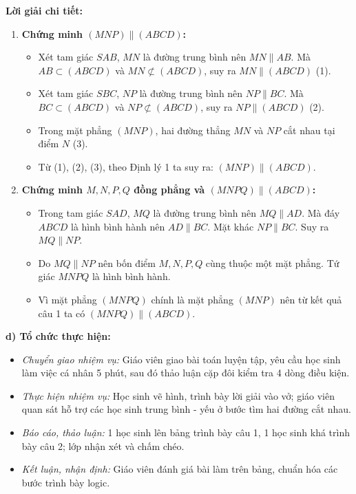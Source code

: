 \documentclass[12pt, a4paper]{article}
\begin{document}
\textbf{Lời giải chi tiết:}
\begin{enumerate}[leftmargin=0.6cm]
    \item \textbf{Chứng minh $(MNP) \parallel (ABCD)$:}
    \begin{itemize}
        \item Xét tam giác $SAB$, $MN$ là đường trung bình nên $MN \parallel AB$.
        Mà $AB \subset (ABCD)$ và $MN \not\subset (ABCD)$, suy ra $MN \parallel (ABCD)$ (1).
        \item Xét tam giác $SBC$, $NP$ là đường trung bình nên $NP \parallel BC$.
        Mà $BC \subset (ABCD)$ và $NP \not\subset (ABCD)$, suy ra $NP \parallel (ABCD)$ (2).
        \item Trong mặt phẳng $(MNP)$, hai đường thẳng $MN$ và $NP$ cắt nhau tại điểm $N$ (3).
        \item Từ (1), (2), (3), theo Định lý 1 ta suy ra: $(MNP) \parallel (ABCD)$.
    \end{itemize}

    \item \textbf{Chứng minh $M, N, P, Q$ đồng phẳng và $(MNPQ) \parallel (ABCD)$:}
    \begin{itemize}
        \item Trong tam giác $SAD$, $MQ$ là đường trung bình nên $MQ \parallel AD$. Mà đáy $ABCD$ là hình bình hành nên $AD \parallel BC$. Mặt khác $NP \parallel BC$. Suy ra $MQ \parallel NP$.
        \item Do $MQ \parallel NP$ nên bốn điểm $M, N, P, Q$ cùng thuộc một mặt phẳng. Tứ giác $MNPQ$ là hình bình hành.
        \item Vì mặt phẳng $(MNPQ)$ chính là mặt phẳng $(MNP)$ nên từ kết quả câu 1 ta có $(MNPQ) \parallel (ABCD)$.
    \end{itemize}
\end{enumerate}

\noindent \textbf{d) Tổ chức thực hiện:}
\begin{itemize}[leftmargin=0.8cm]
    \item \textit{Chuyển giao nhiệm vụ:} Giáo viên giao bài toán luyện tập, yêu cầu học sinh làm việc cá nhân 5 phút, sau đó thảo luận cặp đôi kiểm tra 4 dòng điều kiện.
    \item \textit{Thực hiện nhiệm vụ:} Học sinh vẽ hình, trình bày lời giải vào vở; giáo viên quan sát hỗ trợ các học sinh trung bình - yếu ở bước tìm hai đường cắt nhau.
    \item \textit{Báo cáo, thảo luận:} 1 học sinh lên bảng trình bày câu 1, 1 học sinh khá trình bày câu 2; lớp nhận xét và chấm chéo.
    \item \textit{Kết luận, nhận định:} Giáo viên đánh giá bài làm trên bảng, chuẩn hóa các bước trình bày logic.
\end{itemize}
\end{document}
